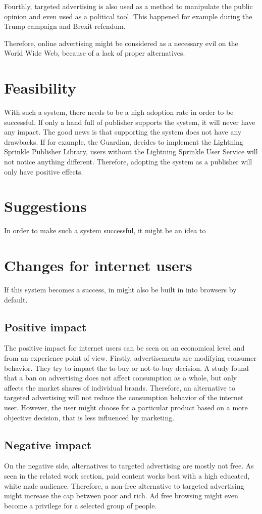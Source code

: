 Fourthly, targeted advertising is also used as a method to manipulate the public opinion and even used as a political tool. This happened for example during the Trump campaign and Brexit refendum\cite{cadwalladr2018cambridge}.

Therefore, online advertising might be considered as a necessary evil on the World Wide Web, because of a lack of proper alternatives.

\section{Feasibility}
With such a system, there needs to be a high adoption rate in order to be successful. If only a hand full of publisher supports the system, it will never have any impact. The good news is that supporting the system does not have any drawbacks. If for example, the Guardian, decides to implement the Lightning Sprinkle Publisher Library, users without the Lightning Sprinkle User Service will not notice anything different. Therefore, adopting the system as a publisher will only have positive effects.



\section{Suggestions}
In order to make such a system successful, it might be an idea to 


\section{Changes for internet users}
If this system becomes a success, in might also be built in into browsers by default. 

\subsection{Positive impact}
The positive impact for internet users can be seen on an economical level and from an experience point of view. Firstly, advertisements are modifying consumer behavior. They try to impact the to-buy or not-to-buy decision\cite{johnson2007consumer}. A study found that a ban on advertising does not affect consumption as a whole, but only affects the market shares of individual brands\cite{advertisementsconsumption}. Therefore, an alternative to targeted advertising will not reduce the consumption behavior of the internet user. However, the user might choose for a particular product based on a more objective decision, that is less influenced by marketing.

\subsection{Negative impact}
On the negative side, alternatives to targeted advertising are mostly not free. As seen in the related work section, paid content works best with a high educated, white male audience. Therefore, a non-free alternative to targeted advertising might increase the cap between poor and rich. Ad free browsing might even become a privilege for a selected group of people.
